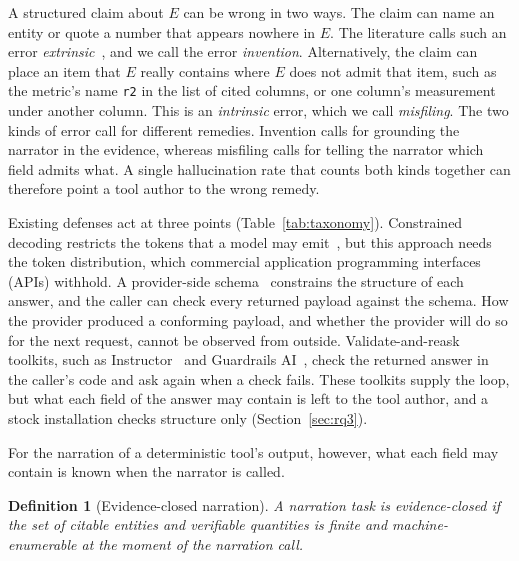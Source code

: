 \documentclass[journal]{IEEEtran}
\newtheorem{definitionx}{Definition}
\begin{document}
A structured claim about $E$ can be wrong in two ways. The claim can name an
entity or quote a number that appears nowhere in $E$. The literature calls
such an error \emph{extrinsic}~\cite{ji,maynez2020faithfulness}, and we call
the error \emph{invention}. Alternatively, the claim can place an item that $E$
really contains where $E$ does not admit that item, such as the metric's name
\texttt{r2} in the list of cited columns, or one column's measurement under
another column. This is an \emph{intrinsic} error, which we call
\emph{misfiling}. The two kinds of error call for different remedies.
Invention calls for grounding the narrator in the evidence, whereas misfiling
calls for telling the narrator which field admits what. A single hallucination
rate that counts both kinds together can therefore point a tool author to the
wrong remedy.

Existing defenses act at three points (Table~\ref{tab:taxonomy}). Constrained
decoding restricts the tokens that a model may
emit~\cite{outlines,lmql,gcd,guidance,scholak2021picard}, but this approach
needs the token distribution, which commercial application programming
interfaces (APIs) withhold. A provider-side
schema~\cite{structured} constrains the structure of each answer, and the
caller can check every returned payload against the schema. How the provider
produced a conforming payload, and whether the provider will do so for the
next request, cannot be observed from outside. Validate-and-reask toolkits,
such as Instructor~\cite{liu2023instructor} and Guardrails
AI~\cite{guardrailsai}, check the returned answer in the caller's code and ask
again when a check fails. These toolkits supply the loop, but what each field
of the answer may contain is left to the tool author, and a stock installation
checks structure only (Section~\ref{sec:rq3}).

For the narration of a deterministic tool's output, however, what each field
may contain is known when the narrator is called.

\begin{definitionx}[Evidence-closed narration]\label{def:closed}
A narration task is \emph{evidence-closed} if the set of citable entities and
verifiable quantities is finite and machine-enumerable at the moment of the
narration call.
\end{definitionx}
\end{document}
